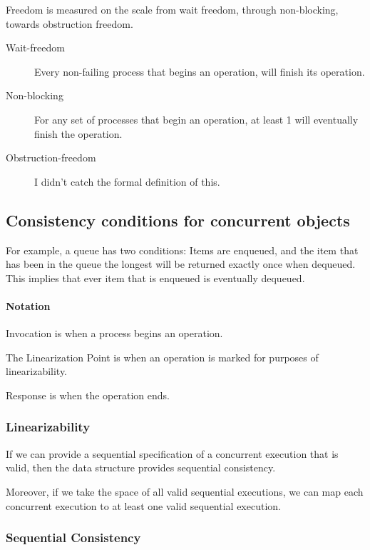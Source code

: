 \documentclass{idc_msc}
\begin{document}
Freedom is measured on the scale from wait freedom, through non-blocking, towards obstruction freedom.

\begin{description}
  \item[Wait-freedom] Every non-failing process that begins an operation, will finish its operation.
  \item[Non-blocking] For any set of processes that begin an operation, at least 1 will eventually finish the operation.
  \item[Obstruction-freedom] I didn't catch the formal definition of this.
\end{description}

\subsection{Consistency conditions for concurrent objects}

For example, a queue has two conditions: Items are enqueued, and the item that has been in the queue the longest will be returned exactly once when dequeued. This implies that ever item that is enqueued is eventually dequeued.

\paragraph{Notation}

Invocation is when a process begins an operation.

The Linearization Point is when an operation is marked for purposes of linearizability.

Response is when the operation ends.

\subsubsection{Linearizability}

If we can provide a sequential specification of a concurrent execution that is valid, then the data structure provides sequential consistency.

Moreover, if we take the space of all valid sequential executions, we can map each concurrent execution to at least one valid sequential execution.

\subsubsection{Sequential Consistency}
\end{document}
